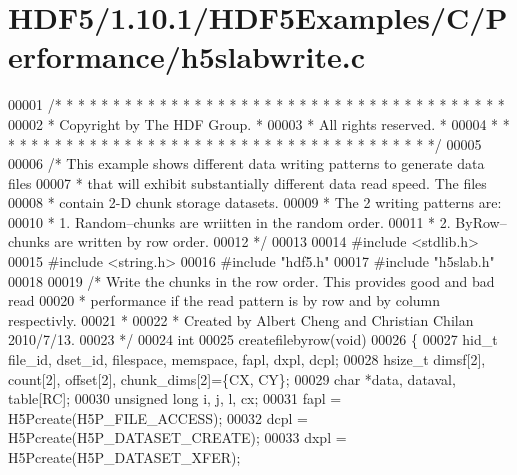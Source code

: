 \hypertarget{_h_d_f5_21_810_81_2_h_d_f5_examples_2_c_2_performance_2h5slabwrite_8c_source}{}\section{H\+D\+F5/1.10.1/\+H\+D\+F5\+Examples/\+C/\+Performance/h5slabwrite.c}
\label{_h_d_f5_21_810_81_2_h_d_f5_examples_2_c_2_performance_2h5slabwrite_8c_source}

\begin{DoxyCode}
00001 \textcolor{comment}{/* * * * * * * * * * * * * * * * * * * * * * * * * * * * * * * * * * * * * * *}
00002 \textcolor{comment}{ * Copyright by The HDF Group.                                               *}
00003 \textcolor{comment}{ * All rights reserved.                                                      *}
00004 \textcolor{comment}{ * * * * * * * * * * * * * * * * * * * * * * * * * * * * * * * * * * * * * * */}
00005 
00006 \textcolor{comment}{/* This example shows different data writing patterns to generate data files}
00007 \textcolor{comment}{ * that will exhibit substantially different data read speed. The files}
00008 \textcolor{comment}{ * contain 2-D chunk storage datasets.}
00009 \textcolor{comment}{ * The 2 writing patterns are:}
00010 \textcolor{comment}{ * 1. Random--chunks are wriitten in the random order.}
00011 \textcolor{comment}{ * 2. ByRow--chunks are written by row order.}
00012 \textcolor{comment}{ */}
00013 
00014 \textcolor{preprocessor}{#include <stdlib.h>}
00015 \textcolor{preprocessor}{#include <string.h>}
00016 \textcolor{preprocessor}{#include "hdf5.h"}
00017 \textcolor{preprocessor}{#include "h5slab.h"}
00018 
00019 \textcolor{comment}{/* Write the chunks in the row order.  This provides good and bad read}
00020 \textcolor{comment}{ * performance if the read pattern is by row and by column respectivly.}
00021 \textcolor{comment}{ *}
00022 \textcolor{comment}{ * Created by Albert Cheng and Christian Chilan 2010/7/13.}
00023 \textcolor{comment}{ */}
00024 \textcolor{keywordtype}{int}
00025 createfilebyrow(\textcolor{keywordtype}{void})
00026 \{
00027     hid\_t   file\_id, dset\_id, filespace, memspace, fapl, dxpl, dcpl;
00028     hsize\_t dimsf[2], count[2], offset[2], chunk\_dims[2]=\{CX, CY\};
00029     \textcolor{keywordtype}{char}     *data, dataval, table[RC];               
00030     \textcolor{keywordtype}{unsigned} \textcolor{keywordtype}{long} i, j, l, cx;
00031     fapl = H5Pcreate(H5P\_FILE\_ACCESS);
00032     dcpl = H5Pcreate(H5P\_DATASET\_CREATE);
00033     dxpl = H5Pcreate(H5P\_DATASET\_XFER);

\end{DoxyCode}
